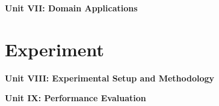 \documentclass[11pt,twoside]{book}
\begin{document}
\begin{center}
\Large\bfseries Unit VII: Domain Applications
\end{center}
\vspace{1em}

\part{Experiment}

\begin{center}
\Large\bfseries Unit VIII: Experimental Setup and Methodology
\end{center}
\vspace{1em}


\begin{center}
\Large\bfseries Unit IX: Performance Evaluation
\end{center}
\vspace{1em}


\backmatter
\printbibliography[title={References}]
\end{document}
